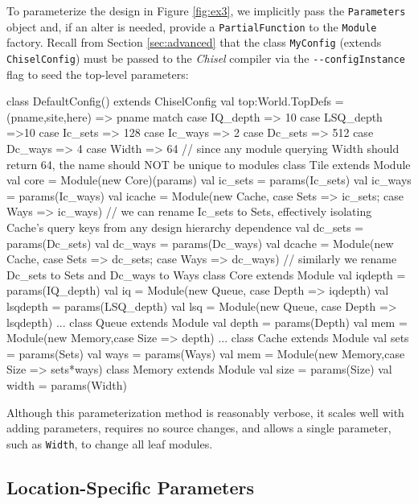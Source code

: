 \documentclass[10pt,twocolumn]{article}
\def\code#1{{\small\tt #1}}
\begin{document}
To parameterize the design in Figure \ref{fig:ex3}, we implicitly pass the \code{Parameters} object and, if an alter is needed, provide a \code{PartialFunction} to the \code{Module} factory. Recall from Section \ref{sec:advanced} that the class \code{MyConfig} (extends \code{ChiselConfig}) must be passed to the {\em Chisel} compiler via the \code{-{-}configInstance} flag to seed the top-level parameters:
\begin{scala}
class DefaultConfig() extends ChiselConfig {
  val top:World.TopDefs = {
    (pname,site,here) => pname match {
      case IQ_depth => 10
      case LSQ_depth =>10
      case Ic_sets => 128
      case Ic_ways => 2
      case Dc_sets => 512
      case Dc_ways => 4
      case Width => 64
      // since any module querying Width should return 64, the name should NOT be unique to modules
    }
  }
}
class Tile extends Module { 
  val core = Module(new Core)(params)
  val ic_sets = params(Ic_sets)
  val ic_ways = params(Ic_ways)
  val icache = Module(new Cache, {case Sets => ic_sets; case Ways => ic_ways})
  // we can rename Ic_sets to Sets, effectively isolating Cache's query keys from any design hierarchy dependence
  val dc_sets = params(Dc_sets)
  val dc_ways = params(Dc_ways)
  val dcache = Module(new Cache, {case Sets => dc_sets; case Ways => dc_ways})
  // similarly we rename Dc_sets to Sets and Dc_ways to Ways
}
class Core extends Module {
  val iqdepth = params(IQ_depth)
  val iq = Module(new Queue, {case Depth => iqdepth})
  val lsqdepth = params(LSQ_depth)
  val lsq = Module(new Queue, {case Depth => lsqdepth})
  ...
}
class Queue extends Module {
  val depth = params(Depth)
  val mem = Module(new Memory,{case Size => depth})
  ...
}
class Cache extends Module {
  val sets = params(Sets)
  val ways = params(Ways)
  val mem = Module(new Memory,{case Size => sets*ways})
}
class Memory extends Module {
  val size = params(Size)
  val width = params(Width)
}
\end{scala}

Although this parameterization method is reasonably verbose, it scales well with adding parameters, requires no source changes, and allows a single parameter, such as \code{Width}, to change all leaf modules.

\subsection{Location-Specific Parameters}
\end{document}
